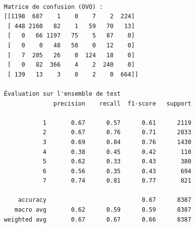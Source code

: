\documentclass[
  letterpaper,
  DIV=11,
  numbers=noendperiod]{scrartcl}
\begin{document}
\begin{verbatim}

Matrice de confusion (OVO) :
[[1198  687    1    0    7    2  224]
 [ 448 2160   82    1   59   70   13]
 [   0   66 1197   75    5   87    0]
 [   0    0   48   50    0   12    0]
 [   7  205   26    0  124   18    0]
 [   0   82  366    4    2  240    0]
 [ 139   13    3    0    2    0  664]]

Évaluation sur l'ensemble de test
              precision    recall  f1-score   support

           1       0.67      0.57      0.61      2119
           2       0.67      0.76      0.71      2833
           3       0.69      0.84      0.76      1430
           4       0.38      0.45      0.42       110
           5       0.62      0.33      0.43       380
           6       0.56      0.35      0.43       694
           7       0.74      0.81      0.77       821

    accuracy                           0.67      8387
   macro avg       0.62      0.59      0.59      8387
weighted avg       0.67      0.67      0.66      8387
\end{verbatim}
\end{document}
